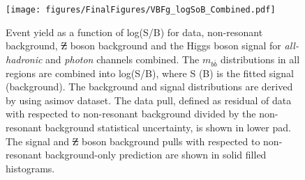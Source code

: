 \documentclass[PAPER, american,coverpage,texlive=2016, english]{\ATLASLATEXPATH atlasdoc}
\providecommand{\DIFadd}[1]{{\protect\color{blue}\uwave{#1}}} %
\providecommand{\DIFdel}[1]{{\protect\color{red}\sout{#1}}}                      %
\providecommand{\DIFaddFL}[1]{\DIFadd{#1}} %
\providecommand{\DIFdelFL}[1]{\DIFdel{#1}} %
\providecommand{\DIFaddbeginFL}{} %
\providecommand{\DIFaddendFL}{} %
\providecommand{\DIFdelbeginFL}{} %
\providecommand{\DIFdelendFL}{} %
\begin{document}
\begin{figure}[tbph]
  \begin{center}
    \DIFdelbeginFL %
\DIFdelendFL \DIFaddbeginFL \texttt{[image: figures/FinalFigures/VBFg\_logSoB\_Combined.pdf]}
\DIFaddendFL \caption{Event yield as a function of log(S/B) for data, non-resonant background, \DIFdelbeginFL \DIFdelFL{Z }\DIFdelendFL \DIFaddbeginFL \DIFaddFL{$Z$ }\DIFaddendFL boson background and the Higgs boson signal for \textit{all-hadronic} and \textit{photon} channels combined. 
    The $m_{b\bar{b}}$ distributions in all regions are combined into log(S/B), where S (B) is the fitted signal (background). The background and signal distributions are derived by using asimov dataset. The data pull, defined as residual of data with respected to non-resonant background divided by the non-resonant background statistical uncertainty, is shown in lower pad. The signal and \DIFdelbeginFL \DIFdelFL{Z }\DIFdelendFL \DIFaddbeginFL \DIFaddFL{$Z$ }\DIFaddendFL boson background pulls with respected to non-resonant background-only prediction are shown in solid filled histograms.}
    \label{fig:logSoB_combined}
  \end{center}
\end{figure}
\end{document}
